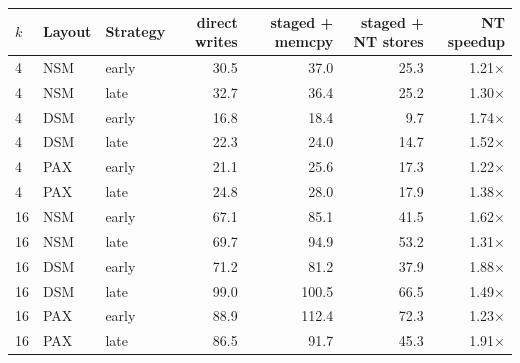\begin{tabular}{lllrrrr}
\toprule
$k$ & Layout & Strategy & direct writes & staged + memcpy & staged + NT stores & NT speedup \\
\midrule
4 & NSM & early & 30.5 & 37.0 & 25.3 & 1.21$\times$ \\
4 & NSM & late & 32.7 & 36.4 & 25.2 & 1.30$\times$ \\
4 & DSM & early & 16.8 & 18.4 & 9.7 & 1.74$\times$ \\
4 & DSM & late & 22.3 & 24.0 & 14.7 & 1.52$\times$ \\
4 & PAX & early & 21.1 & 25.6 & 17.3 & 1.22$\times$ \\
4 & PAX & late & 24.8 & 28.0 & 17.9 & 1.38$\times$ \\
\midrule
16 & NSM & early & 67.1 & 85.1 & 41.5 & 1.62$\times$ \\
16 & NSM & late & 69.7 & 94.9 & 53.2 & 1.31$\times$ \\
16 & DSM & early & 71.2 & 81.2 & 37.9 & 1.88$\times$ \\
16 & DSM & late & 99.0 & 100.5 & 66.5 & 1.49$\times$ \\
16 & PAX & early & 88.9 & 112.4 & 72.3 & 1.23$\times$ \\
16 & PAX & late & 86.5 & 91.7 & 45.3 & 1.91$\times$ \\
\bottomrule
\end{tabular}
